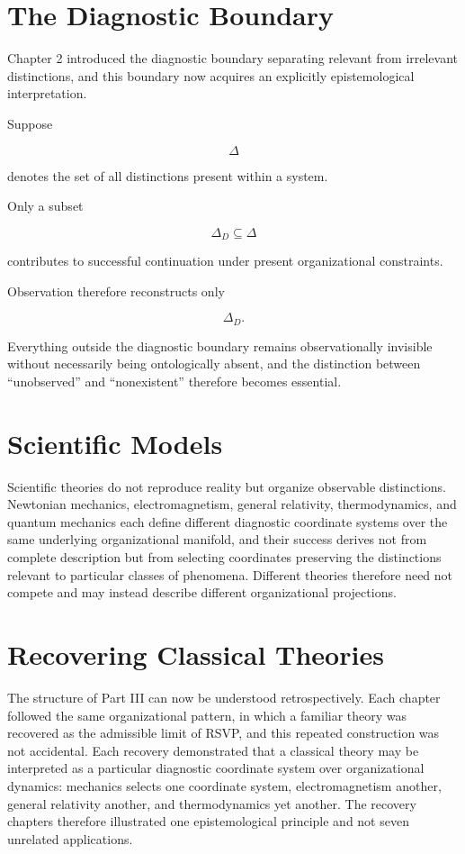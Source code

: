 \documentclass[11pt,oneside]{book}
\numberwithin{equation}{chapter}
\theoremstyle{definition}
\theoremstyle{plain}
\begin{document}
\section{The Diagnostic Boundary}

Chapter 2 introduced the diagnostic boundary separating relevant from irrelevant distinctions, and this boundary now acquires an explicitly epistemological interpretation.

Suppose

\[
\Delta
\]

denotes the set of all distinctions present within a system.

Only a subset

\[
\Delta_D
\subseteq
\Delta
\]

contributes to successful continuation under present organizational
constraints.

Observation therefore reconstructs only

\[
\Delta_D.
\]

Everything outside the diagnostic boundary remains observationally invisible without necessarily being ontologically absent, and the distinction between ``unobserved'' and ``nonexistent'' therefore becomes essential.

\section{Scientific Models}

Scientific theories do not reproduce reality but organize observable distinctions. Newtonian mechanics, electromagnetism, general relativity, thermodynamics, and quantum mechanics each define different diagnostic coordinate systems over the same underlying organizational manifold, and their success derives not from complete description but from selecting coordinates preserving the distinctions relevant to particular classes of phenomena. Different theories therefore need not compete and may instead describe different organizational projections.

\section{Recovering Classical Theories}

The structure of Part III can now be understood retrospectively. Each chapter followed the same organizational pattern, in which a familiar theory was recovered as the admissible limit of RSVP, and this repeated construction was not accidental. Each recovery demonstrated that a classical theory may be interpreted as a particular diagnostic coordinate system over organizational dynamics: mechanics selects one coordinate system, electromagnetism another, general relativity another, and thermodynamics yet another. The recovery chapters therefore illustrated one epistemological principle and not seven unrelated applications.
\end{document}
